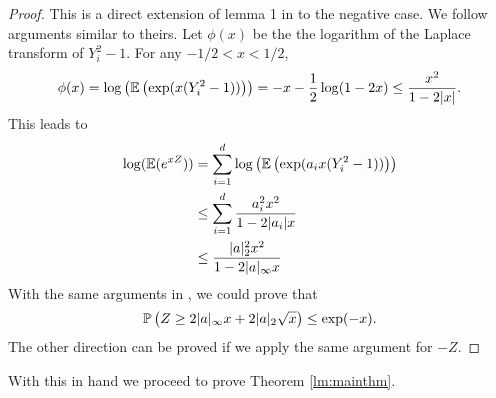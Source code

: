 \begin{proof}
	This is a direct extension of lemma 1 in \cite{laurent2000adaptive} to the negative case. We follow arguments similar to theirs.
	Let $\phi(x)$ be the  the logarithm of the Laplace transform of $Y_i^2-1$. For any $-1/2<x<1/2$,
	$$
	\phi(x)=\log\left(\mathbb{E}\left(\exp(x(Y_i^2-1))\right)\right)=-x-\frac{1}{2}\log(1-2x)\le \frac{x^2}{1-2|x|}.
	$$
	This leads to
	\begin{align*}
	\log(\mathbb{E}(e^{xZ}))&=\sum_{i=1}^d \log\left(\mathbb{E}\left(\exp(a_ix(Y_i^2-1))\right)\right)\\
	&\le \sum_{i=1}^d \frac{a_i^2x^2}{1-2|a_i|x}\\
	&\le \frac{|a|_2^2x^2}{1-2|a|_\infty x}
	\end{align*}
	With the same arguments in \cite{laurent2000adaptive}, we could prove that 
	$$
	\mathbb{P}\left(Z\ge 2|a|_\infty x+2|a|_2\sqrt{x}\right)\le \exp(-x).
	$$
	The other direction can be proved if we apply the same argument for $-Z$.
\end{proof}

With this in hand we proceed to prove Theorem \ref{lm:mainthm}.
	


